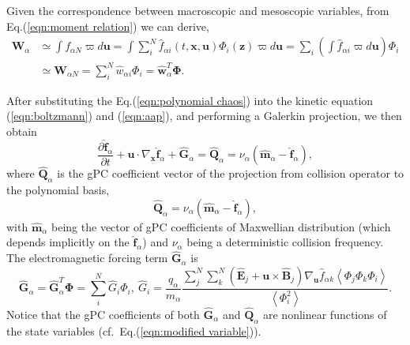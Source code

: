 \documentclass[preprint,3p,12pt,sort&compress]{elsarticle}
\begin{document}
Given the correspondence between macroscopic and mesoscopic variables, from Eq.(\ref{eqn:moment relation}) we can derive,
\begin{equation}
\begin{aligned}
\mathbf W_\alpha & \simeq \int f_{\alpha N} \varpi d\mathbf u = \int \sum_{ i}^N \hat f_{\alpha  i} (t,\mathbf x,\mathbf u) \Phi_ i (\mathbf z) \varpi d\mathbf u = \sum_{ i} \left( \int \hat f_{\alpha  i} \varpi d\mathbf u \right) \Phi_ i\\
& \simeq \mathbf W_{\alpha N} = \sum_{ i}^N \hat w_{\alpha  i} \Phi_ i = \hat{\boldsymbol w}_\alpha^T \boldsymbol \Phi.
\end{aligned}
\end{equation}

After substituting the Eq.(\ref{eqn:polynomial chaos}) into the kinetic equation (\ref{eqn:boltzmann}) and (\ref{eqn:aap}), and performing a Galerkin projection, we then obtain
\begin{equation}
\frac{\partial \hat{\boldsymbol f}_{\alpha}}{\partial t}+\mathbf{u} \cdot \nabla_{\mathbf{x}} \hat {\boldsymbol f}_{\alpha} + \hat{\boldsymbol{G}}_\alpha = \hat{\boldsymbol Q}_{\alpha} = \nu_{\alpha} ( \hat {\boldsymbol m}_{\alpha} - \hat {\boldsymbol f}_{\alpha} ),
\label{eqn:stochastic bgk equation}
\end{equation}
where $\hat{\boldsymbol Q}_{\alpha}$ is the gPC coefficient vector of the projection from collision operator to the polynomial basis, 
\begin{equation}
\hat{\boldsymbol Q}_{\alpha} = \nu_{\alpha} ( \hat {\boldsymbol m}_{\alpha} - \hat {\boldsymbol f}_{\alpha} ),
\label{eqn:galerkin collision term}
\end{equation}
with $\hat {\mathbf m}_{\alpha}$ being the vector of gPC coefficients of Maxwellian distribution (which depends implicitly on the $\hat {\boldsymbol f}_{\alpha}$) and $\nu_\alpha$ being a deterministic collision frequency. 
The electromagnetic forcing term $\hat{\boldsymbol{G}}_\alpha$ is
\begin{equation}
\hat{\boldsymbol{G}}_\alpha = \hat{\boldsymbol{G}}_\alpha^T \boldsymbol{\Phi}= \sum_{ i}^{N} \hat G_ i \Phi_ i,\ 
\hat{G}_{{i}} =
\frac{q_\alpha}{m_\alpha}
\frac{\sum_{{j}}^{N} \sum_{{k}}^{N} 
\left(	
\hat{\mathbf E}_ j+\mathbf{u} \times \hat{\mathbf B}_ j
\right)
\nabla_\mathbf u \hat f_{\alpha k}
	\left\langle\Phi_{{j}} \Phi_{{k}} \Phi_{{i}}\right\rangle}{\left\langle\Phi_{{i}}^{2}\right\rangle}.
\label{eqn:galerkin force term}
\end{equation}
Notice that the gPC coefficients of both $\hat{\boldsymbol{G}}_\alpha$ and $\hat{\boldsymbol{Q}}_\alpha$ are nonlinear functions of the state variables
(cf.\ Eq.(\ref{eqn:modified variable})).
\end{document}
